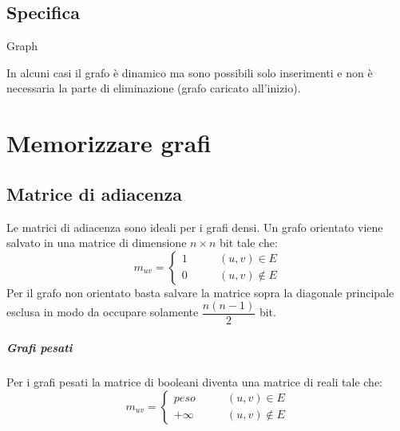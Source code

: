 \subsection{Specifica}
\begin{algorithm}
\DontPrintSemicolon
{}
\caption{Graph}

\GraphCos{}	
\Set \V{}	
\Int \Size{} 
\Set {} 
 
	
	
	
\end{algorithm}
In alcuni casi il grafo \`e dinamico ma sono possibili solo inserimenti e non \`e necessaria la parte di eliminazione (grafo caricato all'inizio).
\section{Memorizzare grafi}
\subsection{Matrice di adiacenza}
Le matrici di adiacenza sono ideali per i grafi densi. Un grafo orientato viene salvato in una matrice di dimensione $n\times n$ bit tale che:
\begin{equation*}
m_{uv}=\begin{cases}1\qquad& (u, v)\in E\\
0 & (u, v)\not\in E
\end{cases}
\end{equation*}
Per il grafo non orientato basta salvare la matrice sopra la diagonale principale esclusa in modo da occupare solamente $\dfrac{n(n-1)}{2}$ bit.
\subparagraph{Grafi pesati}
Per i grafi pesati la matrice di booleani diventa una matrice di reali tale che: 
\begin{equation*}
m_{uv}=\begin{cases}peso\qquad& (u, v)\in E\\
+\infty & (u, v)\not\in E
\end{cases}
\end{equation*}
